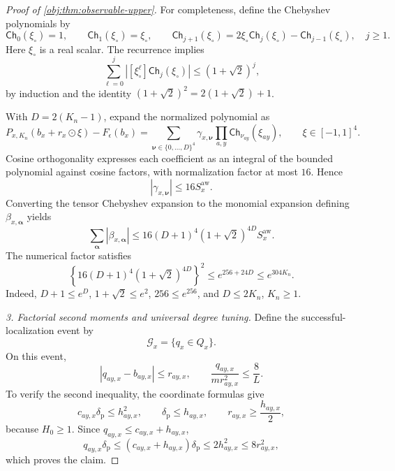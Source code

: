 \documentclass[11pt]{article}
\begin{document}
\begin{proof}[Proof of \cref{obj:thm:observable-upper}]
For completeness, define the Chebyshev polynomials by
\[
\mathsf{Ch}_0(\xi_\circ)=1,\qquad
\mathsf{Ch}_1(\xi_\circ)=\xi_\circ,\qquad
\mathsf{Ch}_{j+1}(\xi_\circ)
=2\xi_\circ\mathsf{Ch}_j(\xi_\circ)-\mathsf{Ch}_{j-1}(\xi_\circ),
\quad j\ge1.
\]
Here \(\xi_\circ\) is a real scalar. The recurrence implies
\[
\sum_{\ell=0}^{j}
\left|[\xi_\circ^\ell]\mathsf{Ch}_j(\xi_\circ)\right|
\le(1+\sqrt2)^j,
\]
by induction and the identity
\((1+\sqrt2)^2=2(1+\sqrt2)+1\).

With \(D=2(K_n-1)\), expand the normalized polynomial as
\[
P_{x,K_n}(b_x+r_x\odot\xi)-F_\epsilon(b_x)
=
\sum_{\boldsymbol\nu\in\{0,\ldots,D\}^4}
\gamma_{x,\boldsymbol\nu}
\prod_{a,y}\mathsf{Ch}_{\nu_{ay}}(\xi_{ay}),
\qquad \xi\in[-1,1]^4.
\]
Cosine orthogonality expresses each coefficient as an integral of the bounded polynomial against cosine factors, with normalization factor at most \(16\). Hence
\[
|\gamma_{x,\boldsymbol\nu}|\le16S_x^{\mathrm{aw}}.
\]
Converting the tensor Chebyshev expansion to the monomial expansion defining \(\beta_{x,\boldsymbol\alpha}\) yields
\[
\sum_{\boldsymbol\alpha}|\beta_{x,\boldsymbol\alpha}|
\le
16(D+1)^4(1+\sqrt2)^{4D}S_x^{\mathrm{aw}}.
\]
The numerical factor satisfies
\[
\left\{16(D+1)^4(1+\sqrt2)^{4D}\right\}^2
\le e^{256+24D}\le e^{304K_n}.
\]
Indeed, \(D+1\le e^D\), \(1+\sqrt2\le e^2\), \(256\le e^{256}\), and \(D\le2K_n\), \(K_n\ge1\).

\textit{3. Factorial second moments and universal degree tuning.}
Define the successful-localization event by
\[
\mathcal G_x=\{q_x\in Q_x\}.
\]
On this event,
\[
|q_{ay,x}-b_{ay,x}|\le r_{ay,x},
\qquad
\frac{q_{ay,x}}{m r_{ay,x}^2}\le\frac8L.
\]
To verify the second inequality, the coordinate formulas give
\[
c_{ay,x}\delta_{\mathrm p}\le h_{ay,x}^2,\qquad
\delta_{\mathrm p}\le h_{ay,x},\qquad
r_{ay,x}\ge\frac{h_{ay,x}}2,
\]
because \(H_0\ge1\). Since \(q_{ay,x}\le c_{ay,x}+h_{ay,x}\),
\[
q_{ay,x}\delta_{\mathrm p}
\le(c_{ay,x}+h_{ay,x})\delta_{\mathrm p}
\le2h_{ay,x}^2
\le8r_{ay,x}^2,
\]
which proves the claim.


\end{proof}
\end{document}
